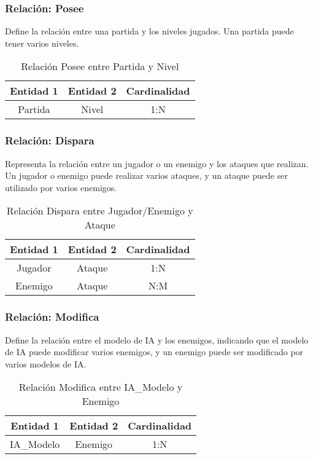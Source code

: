 \subsubsection{Relación: Posee}
Define la relación entre una partida y los niveles jugados. Una partida puede tener varios niveles.
\begin{table}[H]
\centering
\begin{tabular}{|c|c|c|}
\hline
\textbf{Entidad 1} & \textbf{Entidad 2} & \textbf{Cardinalidad} \\ \hline
Partida & Nivel & 1:N \\ \hline
\end{tabular}
\caption{Relación Posee entre Partida y Nivel}
\end{table}

\subsubsection{Relación: Dispara}
Representa la relación entre un jugador o un enemigo y los ataques que realizan. Un jugador o enemigo puede realizar varios ataques, y un ataque puede ser utilizado por varios enemigos.
\begin{table}[H]
\centering
\begin{tabular}{|c|c|c|}
\hline
\textbf{Entidad 1} & \textbf{Entidad 2} & \textbf{Cardinalidad} \\ \hline
Jugador & Ataque & 1:N \\ \hline
Enemigo & Ataque & N:M \\ \hline
\end{tabular}
\caption{Relación Dispara entre Jugador/Enemigo y Ataque}
\end{table}

\subsubsection{Relación: Modifica}
Define la relación entre el modelo de IA y los enemigos, indicando que el modelo de IA puede modificar varios enemigos, y un enemigo puede ser modificado por varios modelos de IA.
\begin{table}[H]
\centering
\begin{tabular}{|c|c|c|}
\hline
\textbf{Entidad 1} & \textbf{Entidad 2} & \textbf{Cardinalidad} \\ \hline
IA\_Modelo & Enemigo & 1:N \\ \hline
\end{tabular}
\caption{Relación Modifica entre IA\_Modelo y Enemigo}
\end{table}


